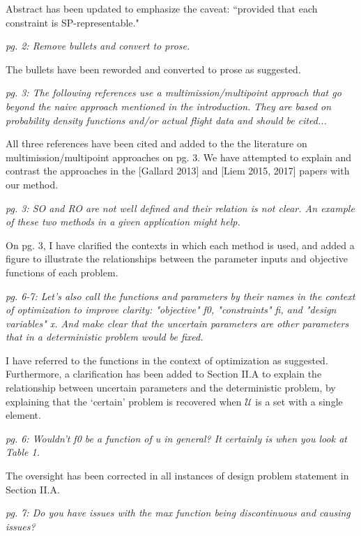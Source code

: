 \documentclass[11pt]{article}
\begin{document}
    Abstract has been updated to emphasize the caveat: ``provided that each constraint is SP-representable."
    \bigskip

    \textit{pg. 2: Remove bullets and convert to prose.}

    The bullets have been reworded and converted to prose as suggested.
    \bigskip

    \textit{pg. 3: The following references use a multimission/multipoint approach
    that go beyond the naive approach mentioned in the introduction.
    They are based on probability density functions and/or actual flight data and should be cited...}

    All three references have been cited and added to the the literature on multimission/multipoint approaches on pg. 3.
    We have attempted to explain and contrast the approaches in the [Gallard 2013] and [Liem 2015, 2017] papers
    with our method.
    \bigskip

    \textit{pg. 3: SO and RO are not well defined and their relation is not clear.
    An example of these two methods in a given application might help.}

    On pg. 3, I have clarified the contexts in which each method is used,
    and added a figure to illustrate the relationships between the parameter inputs
    and objective functions of each problem.
    \bigskip


    \textit{pg. 6-7: Let's also call the functions and parameters by their names in the context of optimization to improve clarity:
    "objective" f0, "constraints" fi, and "design variables" x. And make clear that the uncertain parameters are other parameters that in a deterministic problem would be fixed.}

    I have referred to the functions in the context of optimization as suggested. Furthermore,
    a clarification has been added to Section II.A to explain the relationship between uncertain parameters and the
    deterministic problem, by explaining that the `certain' problem is
    recovered when $\mathcal{U}$ is a set with a single element.
    \bigskip


    \textit{pg. 6: Wouldn't f0 be a function of u in general? It certainly is when you look at Table 1.}

    The oversight has been corrected in all instances of design problem statement in Section II.A.
    \bigskip

    \textit{pg. 7: Do you have issues with the max function being discontinuous and causing issues?}
\end{document}
